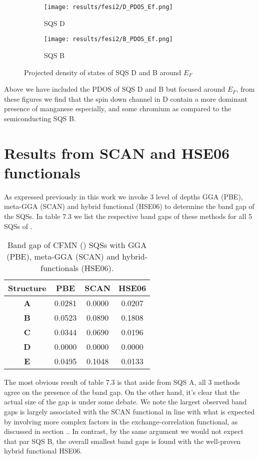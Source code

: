   
\begin{figure}[H]
	\centering
	\begin{subfigure}{.45\textwidth}
			\texttt{[image: results/fesi2/D\_PDOS\_Ef.png]}
			\caption{SQS D}		
	\end{subfigure}
	\hspace{0.5cm}
	\begin{subfigure}{.45\textwidth}
		\texttt{[image: results/fesi2/B\_PDOS\_Ef.png]}
		\caption{SQS B}		
	\end{subfigure}
	\caption{Projected density of states of SQS D and B around $E_F$}
\end{figure}

Above we have included the PDOS of SQS D and B but focused around $E_F$, from these figures we find that the spin down channel in D contain a more dominant presence of manganese especially, and some chromium as compared to the semiconducting SQS B.  

\section{Results from SCAN and HSE06 functionals}

As expressed previously in this work we invoke 3 level of depths GGA (PBE), meta-GGA (SCAN) and hybrid functional (HSE06) to determine the band gap of the SQSs. In table 7.3 we list the respective band gaps of these methods for all 5 SQSs of .

\begin{table}[H]
\centering
\begin{tabular}{@{}cccc@{}}
\toprule
Structure  & PBE    & SCAN   & HSE06  \\ \midrule
\textbf{A} & 0.0281 & 0.0000 & 0.0207 \\
\textbf{B} & 0.0523 & 0.0890 & 0.1808 \\
\textbf{C} & 0.0344 & 0.0690 & 0.0196 \\
\textbf{D} & 0.0000 & 0.0000 & 0.0000 \\
\textbf{E} & 0.0495 & 0.1048 & 0.0133 \\ \bottomrule
\end{tabular}
\caption{Band gap of CFMN () SQSs with GGA (PBE), meta-GGA (SCAN) and hybrid-functionals (HSE06).}
\end{table}

The most obvious result of table 7.3 is that aside from SQS A, all 3 methods agree on the presence of the band gap. On the other hand, it's clear that the actual size of the gap is under some debate. We note the largest observed band gaps is largely associated with the SCAN functional in line with what is expected by involving more complex factors in the exchange-correlation functional, as discussed in section .. In contrast, by the same argument we would not expect that par SQS B, the overall smallest band gaps is found with the well-proven hybrid functional HSE06.
 

